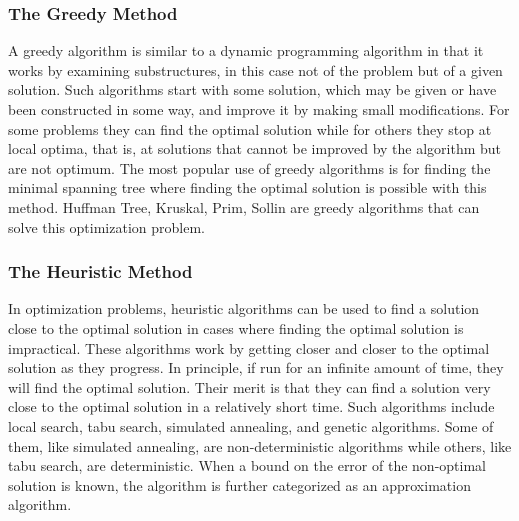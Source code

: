 \documentclass[12pt,a4paper]{book}
\begin{document}
\subsubsection{The Greedy Method}
A greedy algorithm is similar to a dynamic programming algorithm in that it works by examining substructures, in this case not of the problem but of a given solution. Such algorithms start with some solution, which may be given or have been constructed in some way, and improve it by making small modifications. For some problems they can find the optimal solution while for others they stop at local optima, that is, at solutions that cannot be improved by the algorithm but are not optimum. The most popular use of greedy algorithms is for finding the minimal spanning tree where finding the optimal solution is possible with this method. Huffman Tree, Kruskal, Prim, Sollin are greedy algorithms that can solve this optimization problem.
\subsubsection{The Heuristic Method}
In optimization problems, heuristic algorithms can be used to find a solution close to the optimal solution in cases where finding the optimal solution is impractical. These algorithms work by getting closer and closer to the optimal solution as they progress. In principle, if run for an infinite amount of time, they will find the optimal solution. Their merit is that they can find a solution very close to the optimal solution in a relatively short time. Such algorithms include local search, tabu search, simulated annealing, and genetic algorithms. Some of them, like simulated annealing, are non-deterministic algorithms while others, like tabu search, are deterministic. When a bound on the error of the non-optimal solution is known, the algorithm is further categorized as an approximation algorithm.
\end{document}
